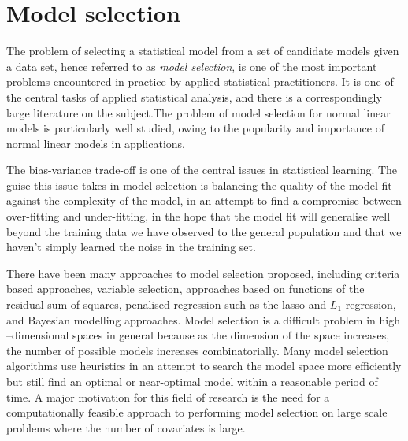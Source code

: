 \section{Model selection}

The problem of selecting a statistical model from a set of candidate models given a data set, hence referred
to as \emph{model selection}, is one of the most important problems encountered in practice by applied
statistical practitioners. It is one of the central tasks of applied statistical analysis, and there is a
correspondingly large literature on the subject.The problem of model selection for normal linear models is
particularly well studied, owing to the popularity and importance of normal linear models in applications.

The bias-variance trade-off is one of the central issues in statistical learning. The guise this issue takes
in model selection is balancing the quality of the model fit against the complexity of the model, in an
attempt to find a compromise between over-fitting and under-fitting, in the hope that the model fit will
generalise well beyond the training data we have observed to the general population and that we haven't simply
learned the noise in the training set.

There have been many approaches to model selection proposed, including criteria based approaches, variable
selection, approaches based on functions of the residual sum of squares, penalised regression such as the
lasso and $L_1$ regression, and Bayesian modelling approaches. Model selection is a difficult problem in high
--dimensional spaces in general because as the dimension of the space increases, the number of possible models
increases combinatorially. Many model selection algorithms use heuristics in an attempt to search the model
space more efficiently but still find an optimal or near-optimal model within a reasonable period of time. A
major motivation for this field of research is the need for a computationally feasible approach to performing
model selection on large scale problems where the number of covariates is large.

